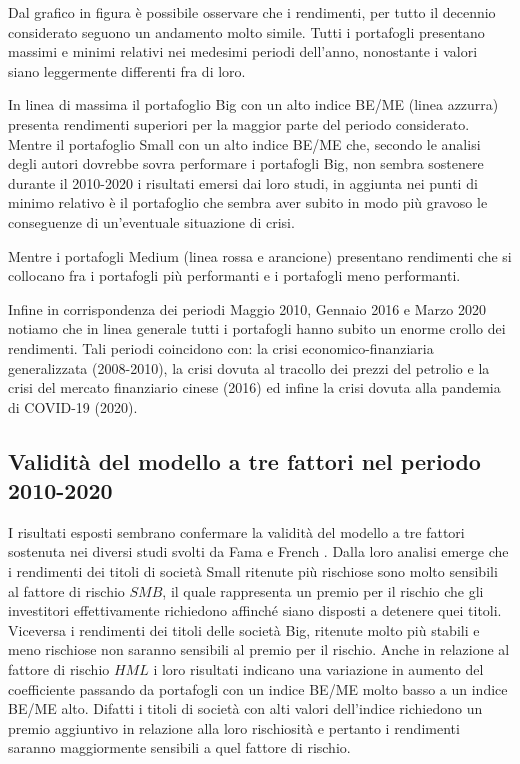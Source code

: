 Dal grafico in figura è possibile osservare che i rendimenti, per tutto il decennio considerato seguono un andamento molto simile. Tutti i portafogli presentano massimi e minimi relativi nei medesimi periodi dell'anno, nonostante i valori siano leggermente differenti fra di loro. 

In linea di massima il portafoglio Big con un alto indice BE/ME (linea azzurra) presenta rendimenti superiori per la maggior parte del periodo considerato. Mentre il portafoglio Small con un alto indice BE/ME che, secondo le analisi degli autori dovrebbe sovra performare i portafogli Big, non sembra sostenere durante il 2010-2020 i risultati emersi dai loro studi, in aggiunta nei punti di minimo relativo è il portafoglio che sembra aver subito in modo più gravoso le conseguenze di un'eventuale situazione di crisi. 

Mentre i portafogli Medium (linea rossa e arancione) presentano rendimenti che si collocano fra i portafogli più performanti e i portafogli meno performanti. 

Infine in corrispondenza dei periodi Maggio 2010, Gennaio 2016 e Marzo 2020 notiamo che in linea generale tutti i portafogli hanno subito un enorme crollo dei rendimenti. Tali periodi coincidono con: la crisi economico-finanziaria generalizzata (2008-2010), la crisi dovuta al tracollo dei prezzi del petrolio e la crisi del mercato finanziario cinese (2016) ed infine la crisi dovuta alla pandemia di COVID-19 (2020).

\subsection{Validità del modello a tre fattori nel periodo 2010-2020}
I risultati esposti sembrano confermare la validità del modello a tre fattori sostenuta nei diversi studi svolti da Fama e French \cite{fama_common_1993}  \cite{fama_multifactor_1996} \cite{fama_cross-section_1992}. Dalla loro analisi emerge che i rendimenti dei titoli di società Small ritenute più rischiose sono molto sensibili al fattore di rischio $SMB$, il quale rappresenta un premio per il rischio che gli investitori effettivamente richiedono affinché siano disposti a detenere quei titoli. Viceversa i rendimenti dei titoli delle società Big, ritenute molto più stabili e meno rischiose non saranno sensibili al premio per il rischio. Anche in relazione al fattore di rischio $HML$ i loro risultati indicano una variazione in aumento del coefficiente passando da portafogli con un indice BE/ME molto basso a un indice BE/ME alto. Difatti i titoli di società con alti valori dell'indice richiedono un premio aggiuntivo in relazione alla loro rischiosità e pertanto i rendimenti saranno maggiormente sensibili a quel fattore di rischio. 

